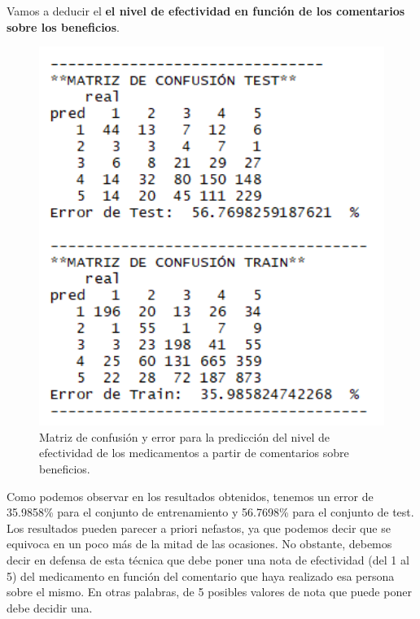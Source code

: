 \documentclass[spanish,]{article}
\newenvironment{Shaded}{\begin{snugshade}}{\end{snugshade}}
\newcommand{\KeywordTok}[1]{\textcolor[rgb]{0.13,0.29,0.53}{\textbf{#1}}}
\newcommand{\OperatorTok}[1]{\textcolor[rgb]{0.81,0.36,0.00}{\textbf{#1}}}
\newcommand{\NormalTok}[1]{#1}
\begin{document}
Vamos a deducir el \textbf{el nivel de efectividad en función de los
comentarios sobre los beneficios}.

\begin{Shaded}
\end{Shaded}

\begin{figure}[h]
    \centering
    \includegraphics[width=1\textwidth]{figuras/Bayes/benefits_effectivenessNumber.png}
    \caption{Matriz de confusión y error para la predicción del nivel de efectividad de los medicamentos a partir de comentarios sobre beneficios.}
    \label{fig:bayes:figura1}
\end{figure}

Como podemos observar en los resultados obtenidos, tenemos un error de
35.9858\% para el conjunto de entrenamiento y 56.7698\% para el conjunto
de test. Los resultados pueden parecer a priori nefastos, ya que podemos
decir que se equivoca en un poco más de la mitad de las ocasiones. No
obstante, debemos decir en defensa de esta técnica que debe poner una
nota de efectividad (del 1 al 5) del medicamento en función del
comentario que haya realizado esa persona sobre el mismo. En otras
palabras, de 5 posibles valores de nota que puede poner debe decidir
una.
\end{document}
